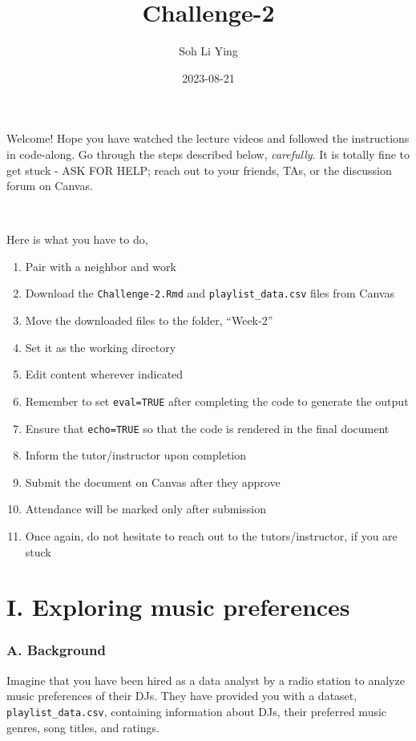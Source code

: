 \documentclass[
]{article}
\title{Challenge-2}
\author{Soh Li Ying}
\date{2023-08-21}
\begin{document}
\maketitle

Welcome! Hope you have watched the lecture videos and followed the
instructions in code-along. Go through the steps described below,
\emph{carefully}. It is totally fine to get stuck - ASK FOR HELP; reach
out to your friends, TAs, or the discussion forum on Canvas.

~

Here is what you have to do,

\begin{enumerate}
\def\labelenumi{\arabic{enumi}.}
\item
  Pair with a neighbor and work
\item
  Download the \texttt{Challenge-2.Rmd} and \texttt{playlist\_data.csv}
  files from Canvas
\item
  Move the downloaded files to the folder, ``Week-2''
\item
  Set it as the working directory
\item
  Edit content wherever indicated
\item
  Remember to set \texttt{eval=TRUE} after completing the code to
  generate the output
\item
  Ensure that \texttt{echo=TRUE} so that the code is rendered in the
  final document
\item
  Inform the tutor/instructor upon completion
\item
  Submit the document on Canvas after they approve
\item
  Attendance will be marked only after submission
\item
  Once again, do not hesitate to reach out to the tutors/instructor, if
  you are stuck
\end{enumerate}

\hypertarget{i.-exploring-music-preferences}{%
\section{I. Exploring music
preferences}\label{i.-exploring-music-preferences}}

\hypertarget{a.-background}{%
\subsubsection{A. Background}\label{a.-background}}

Imagine that you have been hired as a data analyst by a radio station to
analyze music preferences of their DJs. They have provided you with a
dataset, \texttt{playlist\_data.csv}, containing information about DJs,
their preferred music genres, song titles, and ratings.
\end{document}
